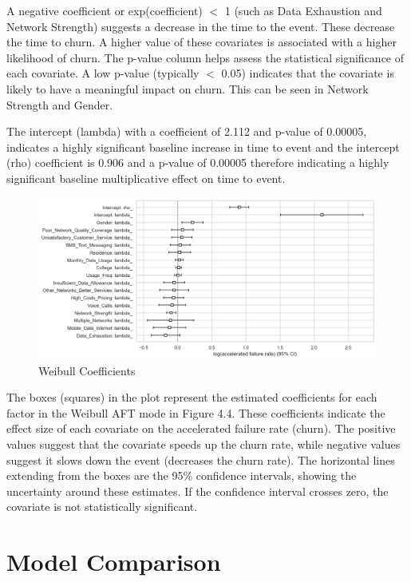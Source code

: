 \documentclass[doublespacing]{report} %
\begin{document}
 A negative coefficient or exp(coefficient)  \(< \) 1 (such as Data Exhaustion and Network Strength) suggests a decrease in the time to the event. These decrease the time to churn. A higher value of these covariates is associated with a higher likelihood of churn.
The p-value column helps assess the statistical significance of each covariate. A low p-value (typically  \(< \) 0.05) indicates that the covariate is likely to have a meaningful impact on churn. This can be seen in Network Strength and Gender.

The intercept (lambda) with a coefficient of 2.112 and p-value of 0.00005, indicates a highly significant baseline increase in time to event and the intercept (rho) coefficient is 0.906 and a p-value of 0.00005 therefore indicating a highly significant baseline multiplicative effect on time to event.

\begin{figure}[H]
    \centering
    \includegraphics[width=1\linewidth]{Figure 4/4.4.png}
    \caption{Weibull Coefficients}
\end{figure}

The boxes (squares) in the plot represent the estimated coefficients for each factor in the Weibull AFT mode in Figure 4.4. These coefficients indicate the effect size of each covariate on the accelerated failure rate (churn). The positive values suggest that the covariate speeds up the churn rate, while negative values suggest it slows down the event (decreases the churn rate). The horizontal lines extending from the boxes are the 95\% confidence intervals, showing the uncertainty around these estimates. If the confidence interval crosses zero, the covariate is not statistically significant.

\section{Model Comparison}
\end{document}
